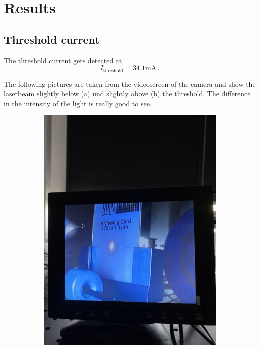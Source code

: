 \section{Results}

\subsection{Threshold current}
The threshold current gets detected at $$ I_{\text{threshold}} = 34.1 \text{mA} \, . $$

The following pictures are taken from the videoscreen of the camera and show the laserbeam slightly below (a) und 
slightly above (b) the threshold. The difference in the intensity of the light is really good to see.

\begin{figure}
    \centering
    \begin{subfigure}[b]{0.45\textwidth}
        \centering
        \includegraphics[width=\textwidth]{beam1.jpeg}

\end{subfigure}
\end{figure}
